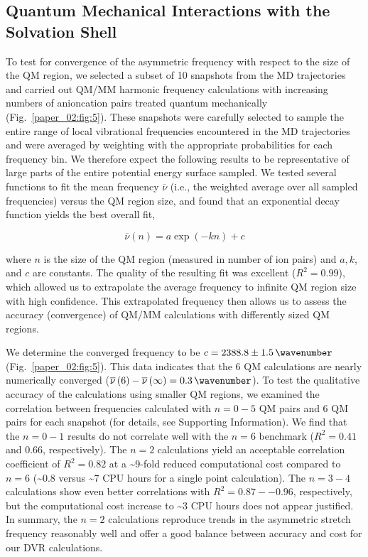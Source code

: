 \subsection{Quantum Mechanical Interactions with the Solvation Shell}
\label{paper_02:ssec:IIIE}

To test for convergence of the asymmetric frequency with respect to the size of the QM region, we selected a subset of \num{10} snapshots from the MD trajectories and carried out QM/MM harmonic frequency calculations with increasing numbers of anion\textendash{}cation pairs treated quantum mechanically (Fig.~\ref{paper_02:fig:5}). These snapshots were carefully selected to sample the entire range of local vibrational frequencies encountered in the MD trajectories and were averaged by weighting with the appropriate probabilities for each frequency bin. We therefore expect the following results to be representative of large parts of the entire potential energy surface sampled. We tested several functions to fit the mean frequency \(\overline{\nu}\) (i.e., the weighted average over all sampled frequencies) versus the QM region size, and found that an exponential decay function yields the best overall fit,

\begin{equation*}
  \overline{\nu}\left( n \right) = a\exp{\left( -kn \right)} + c
\end{equation*}

where \(n\) is the size of the QM region (measured in number of ion pairs) and \(a, k\), and \(c\) are constants. The quality of the resulting fit was excellent (\(R^2 = 0.99\)), which allowed us to extrapolate the average frequency to infinite QM region size with high confidence. This extrapolated frequency then allows us to assess the accuracy (convergence) of QM/MM calculations with differently sized QM regions.

We determine the converged frequency to be \(c = 2388.8 \pm \SI{1.5}{\wavenumber}\) (Fig.~\ref{paper_02:fig:5}). This data indicates that the \num{6} QM calculations are nearly numerically converged (\(\overline{\nu}\left( 6 \right) - \overline{\nu}\left( \infty \right) = \SI{0.3}{\wavenumber}\)). To test the qualitative accuracy of the calculations using smaller QM regions, we examined the correlation between frequencies calculated with \(n = 0-5\) QM pairs and \num{6} QM pairs for each snapshot (for details, see Supporting Information). We find that the \(n = 0-1\) results do not correlate well with the \(n = 6\) benchmark (\(R^{2} = 0.41\) and \num{0.66}, respectively). The \(n = 2\) calculations yield an acceptable correlation coefficient of \(R^2 = 0.82\) at a \textasciitilde{}9-fold reduced computational cost compared to \(n = 6\) (\textasciitilde{}\num{0.8} versus \textasciitilde{}\num{7} CPU hours for a single point calculation). The \(n = 3-4\) calculations show even better correlations with \(R^2 = 0.87 -- 0.96\), respectively, but the computational cost increase to \textasciitilde{}\num{3} CPU hours does not appear justified. In summary, the \(n = 2\) calculations reproduce trends in the  asymmetric stretch frequency reasonably well and offer a good balance between accuracy and cost for our DVR calculations.

